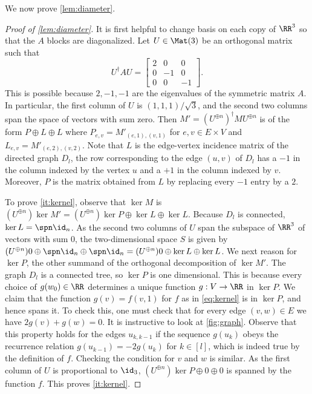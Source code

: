 We now prove \cref{lem:diameter}.
 \begin{proof}[Proof of \cref{lem:diameter}] It is first helpful to change basis on each copy of $\RR^3$ so that the $A$ blocks are diagonalized. Let $U \in \Mat(3)$ be an orthogonal matrix such that 
$$U^\dagger A U =   \begin{bmatrix} 2 & 0 & 0 \\ 0 & -1 & 0 \\ 0 & 0 & -1 \end{bmatrix}.$$
This is possible because $2, -1, -1$ are the eigenvalues of the symmetric matrix $A$. In particular, the first column of $U$ is $(1,1,1)/\sqrt{3}$, and the second two columns span the space of vectors with sum zero. Then $M' = (U^{\oplus n})^\dagger M U^{\oplus n}$ is of the form $P \oplus L \oplus L$ where $P_{e,v} = M'_{(e, 1), (v, 1)}$ for $e, v \in E \times V$ and $L_{e, v} = M'_{(e, 2), (v, 2)}$.  Note that $L$ is the edge-vertex incidence matrix of the directed graph $D_l$, the row corresponding to the edge $(u,v)$ of $D_l$ has a $-1$ in the column indexed by the vertex $u$ and a $+1$ in the column indexed by $v$. Moreover, $P$ is the matrix obtained from $L$ by replacing every $-1$ entry by a $2$.

To prove \cref{it:kernel}, observe that $\ker M$ is $(U^{\oplus n}) \ker M' = (U^{\oplus n}) \ker P \oplus \ker L \oplus \ker L$. Because $D_l$ is connected, $\ker L = \spn \id_n$. As the second two columns of $U$ span the subspace of $\RR^3$ of vectors with sum $0$, the two-dimensional space $S$ is given by $(U^{\oplus n}) 0 \oplus \spn \id_n \oplus \spn \id_n = (U^{\oplus n}) 0 \oplus \ker L \oplus \ker L$. We next reason for $\ker P$, the other summand of the orthogonal decomposition of $\ker M'$. The graph $D_l$ is a connected tree, so $\ker P$ is one dimensional. This is because every choice of $g(w_0) \in \RR$ determines a unique function $g:V \to \RR$ in $\ker P$. We claim that the function $g(v) = f(v,1)$ for $f$ as in \cref{eq:kernel} is in $\ker P$, and hence spans it. To check this, one must check that for every edge $(v,w) \in E$ we have $2g(v) + g(w) = 0$. It is instructive to look at \cref{fig:graph}. Observe that this property holds for the edges $u_{k, k-1}$ if the sequence $g(u_k)$ obeys the recurrence relation $g(u_{k-1}) = -2g(u_k)$ for $k \in [l]$, which is indeed true by the definition of $f$. Checking the condition for $v$ and $w$ is similar. As the first column of $U$ is proportional to $\id_3$, $(U^{\oplus n}) \ker P \oplus 0 \oplus 0$ is spanned by the function $f$. This proves \cref{it:kernel}.


\end{proof}
